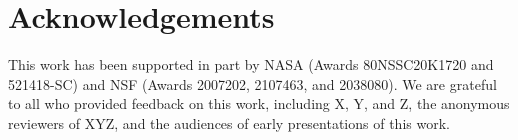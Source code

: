 \section*{Acknowledgements} This work has been supported in part by NASA (Awards 80NSSC20K1720 and 521418-SC) and NSF (Awards 2007202, 2107463, and 2038080). We are grateful to all who provided feedback on this work, including X, Y, and Z, the anonymous reviewers of XYZ, and the audiences of early presentations of this work.
